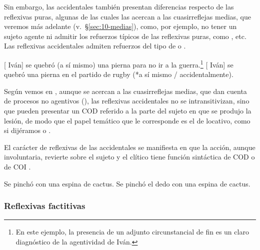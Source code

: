 Sin embargo, las accidentales también presentan diferencias respecto de las
reflexivas puras, algunas de las cuales las acercan a las cuasirreflejas medias,
que veremos más adelante (v.~§\ref{sec:10-medias}), como, por ejemplo, no tener
un sujeto agente ni admitir los refuerzos típicos de las reflexivas puras, como
, etc. Las reflexivas accidentales admiten
refuerzos del tipo de  o .

\begin{exe}
  \ex
    \begin{xlist}
      \ex {}[ Iván] se quebró (a sí mismo) una pierna para no ir a
          la guerra.\footnote{En este ejemplo, la presencia de un adjunto
          circunstancial de fin es un claro diagnóstico de la agentividad de
          Iván.}
      \ex\label{ex:10-ivan-b} {}[ Iván] se quebró una pierna en el
          partido de rugby (*a sí mismo / accidentalmente).
    \end{xlist}
\end{exe}

Según vemos en , aunque se acercan a las cuasirreflejas
medias, que dan cuenta de procesos no agentivos (), las reflexivas accidentales no se intransitivizan, sino que
pueden presentar un COD referido a la parte del sujeto en que se produjo la
lesión, de modo que el papel temático que le corresponde es el de locativo, como
si dijéramos  o .

El carácter de reflexivas de las accidentales se manifiesta en que la acción,
aunque involuntaria, revierte sobre el sujeto y el clítico tiene función
sintáctica de COD  o de COI .

\begin{exe}
  \ex
    \begin{xlist}
      \ex\label{ex:10-espina-a} Se pinchó con una espina de cactus.
      \ex\label{ex:10-espina-b} Se pinchó el dedo con una espina de cactus.
    \end{xlist}
\end{exe}

\subsubsection{Reflexivas factitivas}\label{sec:10-factitivas}

